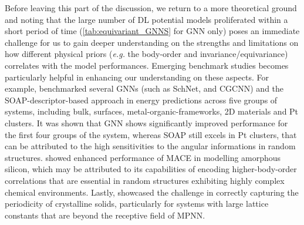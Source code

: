 Before leaving this part of the discussion, we return to a more theoretical ground and noting that the large number of DL potential models proliferated within a short period of time (\cref{tab:equivariant_GNNS} for GNN only) poses an immediate challenge for us to gain deeper understanding on the strengths and limitations on how different physical priors (\emph{e.g.} the body-order and invariance/equivariance) correlates with the model performances. Emerging benchmark studies becomes particularly helpful in enhancing our understanding on these aspects. For example, \cite{fung2021benchmarking} benchmarked several GNNs (such as SchNet,\cite{schutt2017schnet}  and CGCNN\cite{xie2018crystal}) and the SOAP-descriptor-based approach in energy predictions across five groups of systems, including bulk, surfaces, metal-organic-frameworks, 2D materials and Pt clusters. It was shown that GNN shows significantly improved performance for the first four groups of the system, whereas SOAP still excels in Pt clusters, that can be attributed to the high sensitivities to the angular informations in random structures. \citet{kovacs2023evaluation} showed enhanced performance of MACE in modelling amorphous silicon, which may be attributed to its capabilities of encoding higher-body-order correlations that are essential in random structures exhibiting highly complex chemical environments.  Lastly, \citet{gong2023examining} showcased the challenge in correctly capturing the periodicity of crystalline solids, particularly for systems with large lattice constants that are beyond the receptive field of MPNN. %

